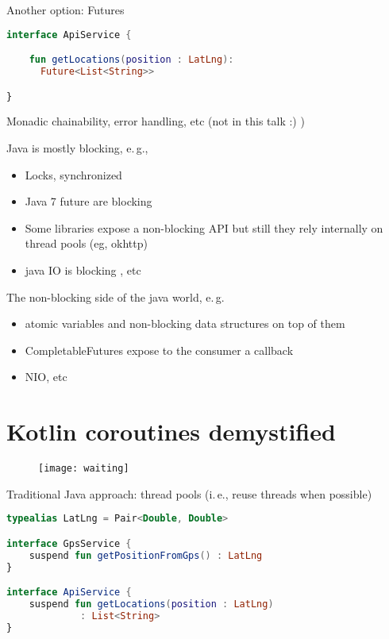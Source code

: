 \documentclass[10pt]{beamer}
\providecommand{\ie}{i.\,e.}
\providecommand{\eg}{e.\,g.}
\begin{document}
\begin{frame}[fragile]
	Another option: Futures 
\begin{lstlisting}[language=Kotlin, basicstyle=\ttfamily]
interface ApiService {

    fun getLocations(position : LatLng): 
      Future<List<String>>

}
\end{lstlisting}
	Monadic chainability, error handling, etc (not in this talk :) ) 
\end{frame}

\begin{frame}
	Java is mostly blocking, \eg, 
	\begin{itemize}
		\item Locks, synchronized
		\item Java 7 future are blocking 
		\item Some libraries expose a non-blocking API but still they rely internally on thread pools (eg, okhttp) 
		\item java IO is blocking , etc
	\end{itemize}

	The non-blocking  side of the java world, \eg 
	\begin{itemize}
		\item atomic variables and non-blocking data structures on top of them
		\item CompletableFutures expose to the consumer a callback 
		\item NIO, etc
	\end{itemize}
	 
\end{frame}


\section{Kotlin coroutines demystified }
\begin{frame}
	\begin{figure}
		\centering
		\texttt{[image: waiting]}
	\end{figure}
\end{frame}

\begin{frame}
	Traditional Java approach: thread pools (\ie, reuse threads when possible) 
\end{frame}
\begin{frame}[fragile]
\begin{lstlisting}[language=Kotlin, basicstyle=\ttfamily]
typealias LatLng = Pair<Double, Double>

interface GpsService { 
    suspend fun getPositionFromGps() : LatLng
}

interface ApiService { 
    suspend fun getLocations(position : LatLng) 
             : List<String>
}
\end{lstlisting}
\end{frame}
\end{document}
